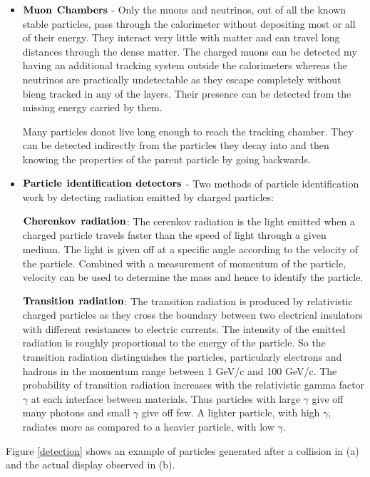 \begin{itemize}
\item
$\bf{Muon}$ $\bf{Chambers}$ - Only the muons and neutrinos, out of all the known stable particles, pass through the calorimeter without depositing most or all of their energy. They interact very little with matter and can travel long distances through the dense matter. The charged muons can be detected my having an additional tracking system outside the calorimeters whereas the neutrinos are practically undetectable as they escape completely without bieng tracked in any of the layers. Their presence can be detected from the missing energy carried by them.

 Many particles donot live long enough to reach the tracking chamber. They can be detected indirectly from the particles they decay into and then knowing the properties of the parent particle by going backwards.

\item
$\bf{Particle}$ $\bf{identification}$ $\bf{detectors}$ - Two methods of particle identification work by detecting radiation emitted by charged particles:

$\bf{Cherenkov}$ $\bf{radiation}$: The cerenkov radiation is the light emitted when a charged particle travels faster than the speed of light through a given medium. The light is given off at a specific angle according to the velocity of the particle. Combined with a measurement of momentum of the particle, velocity can be used to determine the mass and hence to identify the particle.

$\bf{Transition}$ $\bf{radiation}$: The transition radiation is produced by relativistic charged particles as they cross the boundary between two electrical insulators with different resistances to electric currents. The intensity of the emitted radiation is roughly proportional to the energy of the particle. So the transition radiation distinguishes the particles, particularly electrons and hadrons in the momentum range between 1 GeV/c and 100 GeV/c. The probability of transition radiation increases with the relativistic gamma factor $\gamma$ at each interface between materials. Thus particles with large $\gamma$ give off many photons and small 
$\gamma$ give off few. A lighter particle, with high $\gamma$, radiates more as compared to a heavier particle, with low $\gamma$.



\end{itemize}
Figure \ref {detection} shows an example of particles generated after a collision in (a) and the actual display observed in (b).


